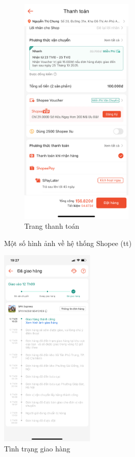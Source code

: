 \begin{figure}[H]
\begin{subfigure}[b]{0.4\textwidth}
        \includegraphics[width=0.6\textwidth]{Payment.PNG}
        \caption{Trang thanh toán}
    \end{subfigure}
    \caption{Một số hình ảnh về hệ thống Shopee (tt)}
\end{figure}
\begin{figure}[H]
    \centering
    \includegraphics[width=0.4\textwidth]{Status.PNG}
    \caption{Tình trạng giao hàng}
\end{figure}
